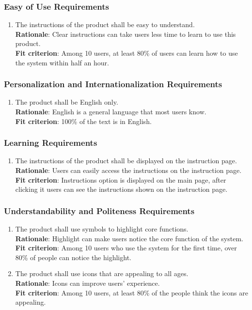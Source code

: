 \documentclass{article}
\begin{document}
\subsubsection{Easy of Use Requirements}
\begin{enumerate}[UH1.1]
    \item The instructions of the product shall be easy to understand.\\
    \textbf{Rationale}: Clear instructions can take users less time to learn to use this product.\\
    \textbf{Fit criterion}: Among 10 users, at least 80\% of users can learn how to use the system within half an hour.
\end{enumerate}
\subsubsection{Personalization and Internationalization Requirements}
\begin{enumerate}[UH2.1]
    \item The product shall be English only.\\
    \textbf{Rationale}: English is a general language that most users know.\\
    \textbf{Fit criterion}: 100\% of the text is in English.
\end{enumerate}
\subsubsection{Learning Requirements}
\begin{enumerate}[UH3.1]
    \item The instructions of the product shall be displayed on the instruction page.\\
    \textbf{Rationale}: Users can easily access the instructions on the instruction page.\\
    \textbf{Fit criterion}: Instructions option is displayed on the main page, after clicking it users can see the instructions shown on the instruction page.
\end{enumerate}
\subsubsection{Understandability and Politeness Requirements}
\begin{enumerate}[UH4.1]
    \item The product shall use symbols to highlight core functions.\\
    \textbf{Rationale}: Highlight can make users notice the core function of the system.\\
    \textbf{Fit criterion}: Among 10 users who use the system for the first time, over 80\% of people can notice the highlight.
    
    \item The product shall use icons that are appealing to all ages.\\
    \textbf{Rationale}: Icons can improve users' experience.\\
    \textbf{Fit criterion}: Among 10 users, at least 80\% of the people think the icons are appealing.
\end{enumerate}
\end{document}
